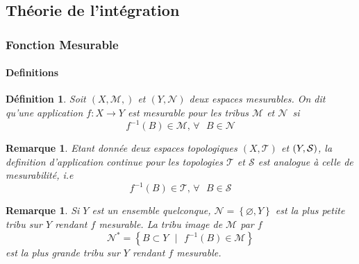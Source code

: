 \documentclass[3pt]{article}
\newtheorem{definition}[theorem]{D\'{e}finition}
\newtheorem{remark}[theorem]{Remarque}
\begin{document}
\subsection{Th\'{e}orie de l'int\'{e}gration}

\bigskip 

\subsubsection{Fonction Mesurable}

\bigskip 

\paragraph{Definitions}

\bigskip 

\begin{definition}
Soit $(X,\mathcal{M},)$ et $(Y,\mathcal{N})$ deux espaces mesurables. On dit
qu'une application $f:X\rightarrow Y$ est mesurable pour les tribus $%
\mathcal{M}$ et $\mathcal{N}$\ si 
\begin{equation*}
f^{-1}(B)\in \mathcal{M}\text{, }\forall \text{ }B\in \mathcal{N}
\end{equation*}
\end{definition}

\bigskip 

\begin{remark}
Etant donn\'{e}e deux espaces topologiques $(X,\mathcal{T})$ et $(Y,\mathcal{%
S})$, la definition d'application continue pour les topologies $\mathcal{T}$
et $\mathcal{S}$ est analogue \`{a} celle de mesurabilit\'{e}, i.e%
\begin{equation*}
f^{-1}(B)\in \mathcal{T}\text{, }\forall \text{ }B\in \mathcal{S}
\end{equation*}
\end{remark}

\bigskip 

\begin{remark}
Si $Y$ est un ensemble quelconque, $\mathcal{N=}\left\{ \varnothing
,Y\right\} $ est la plus petite tribu sur $Y$ rendant $f$ mesurable. La
tribu image de $\mathcal{M}$ par $f\ $%
\begin{equation*}
\mathcal{N}^{\ast }\mathcal{=}\left\{ B\subset Y\text{ }|\text{ }%
f^{-1}(B)\in \mathcal{M}\right\} 
\end{equation*}%
est la plus grande tribu sur $Y$ rendant $f$ mesurable. 
\end{remark}
\end{document}
